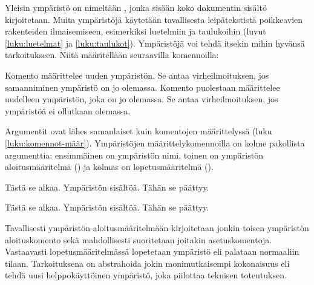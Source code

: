 \begin{koodilohkosis}
  \begin{nimi}
  \end{nimi}
\end{koodilohkosis}

Yleisin ympäristö on nimeltään , jonka sisään koko
dokumentin sisältö kirjoitetaan. Muita ympäristöjä käytetään
tavallisesta leipätekstistä poikkeavien rakenteiden ilmaisemiseen,
esimerkiksi luetelmiin ja taulukoihin (luvut \ref{luku:luetelmat} ja
\ref{luku:taulukot}). Ympäristöjä voi tehdä itsekin mihin hyvänsä
tarkoitukseen. Niitä määritellään seuraavilla komennoilla:

\begin{koodilohkosis}
  \newenvironment   {nimi}[n][oletus]{aloitus}{lopetus}
  \renewenvironment {nimi}[n][oletus]{aloitus}{lopetus}
\end{koodilohkosis}

Komento  määrittelee uuden ympäristön. Se
antaa virheilmoituksen, jos samanniminen ympäristö on jo olemassa.
Komento  puolestaan määrittelee uudelleen
ympäristön, joka on jo olemassa. Se antaa virheilmoituksen, jos
ympäristöä ei ollutkaan olemassa.

Argumentit ovat lähes samanlaiset kuin komentojen määrittelyssä (luku
\ref{luku:komennot-määr}). Ympäristöjen määrittelykomennoilla on kolme
pakollista argumenttia: ensimmäinen on ympäristön nimi, toinen on
ympäristön aloitusmääritelmä () ja kolmas on
lopetusmääritelmä ().


\begin{koodilohkosis}
  \newenvironment{ymp}{Tästä se alkaa.}{Tähän se päättyy.}

  \begin{ymp}
    Ympäristön sisältöä.
  \end{ymp}
\end{koodilohkosis}

\begin{tulossis}
  Tästä se alkaa. Ympäristön sisältöä. Tähän se päättyy.
\end{tulossis}

Tavallisesti ympäristön aloitusmääritelmään kirjoitetaan jonkin toisen
ympäristön aloituskomento sekä mahdollisesti suoritetaan joitakin
asetuskomentoja. Vastaavasti lopetusmääritelmässä lopetetaan ympäristö
eli palataan normaaliin tilaan. Tarkoituksena on abstrahoida jokin
monimutkaisempi kokonaisuus eli tehdä uusi helppokäyttöinen ympäristö, joka
piilottaa teknisen toteutuksen.

